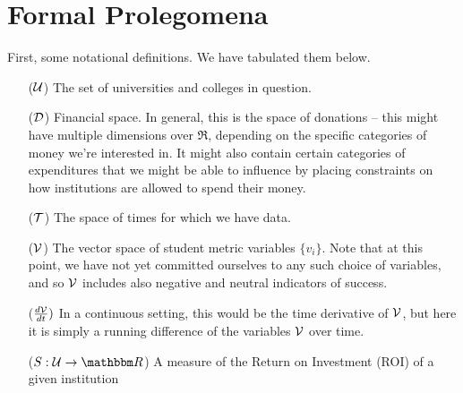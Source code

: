\documentclass[paper.tex]{subfiles}
\begin{document}
	
	\section{Formal Prolegomena}
	
	First, some notational definitions. We have tabulated them below. 
	
	
	\begin{itemize}
		\item[($\mathcal{U}$)] The set of universities and colleges in question.
		\item[($\mathcal{D}$)] Financial space. In general, this is the space of donations -- this might have multiple dimensions over $\Re$, depending on the specific categories of money we're interested in. It might also contain certain categories of expenditures that we might be able to influence by placing constraints on how institutions are allowed to spend their money.  
		\item[($\mathcal{T}$)] The space of times for which we have data. 
		\item[($\mathcal{V}$)] The vector space of student metric variables $\{v_i\}$. Note that at this point, we have not yet committed ourselves to any such choice of variables, and so $\mathcal{V}$ includes also negative and neutral indicators of success.
		\item[($\frac{d\mathcal{V}}{dt})$] In a continuous setting, this would be the time derivative of  $\mathcal{V}$, but here it is simply a running difference of the variables $\mathcal{V}$ over time.  
	\end{itemize}
	
	\begin{itemize}[leftmargin=6em]
		\item[($S : \UU\to\Re$)] A measure of the Return on Investment (ROI) of a given institution
	\end{itemize}
			
\end{document}
